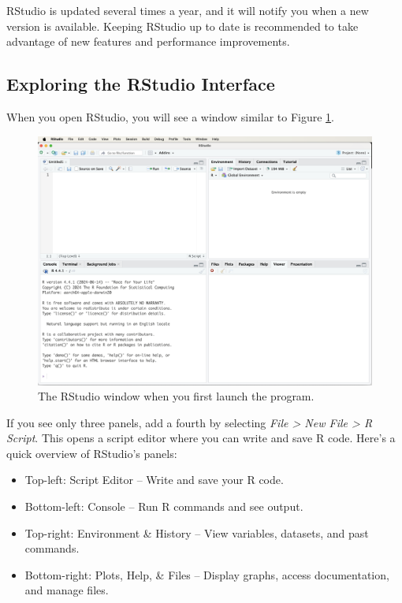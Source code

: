 \documentclass[
]{book}
\providecommand{\tightlist}{%
  \setlength{\itemsep}{0pt}\setlength{\parskip}{0pt}}
\theoremstyle{definition}
\theoremstyle{definition}
\theoremstyle{definition}
\theoremstyle{definition}
\theoremstyle{remark}
\begin{document}
RStudio is updated several times a year, and it will notify you when a new version is available. Keeping RStudio up to date is recommended to take advantage of new features and performance improvements.

\subsection*{Exploring the RStudio Interface}\label{exploring-the-rstudio-interface}

When you open RStudio, you will see a window similar to Figure \ref{fig:RStudio-window-1}.

\begin{figure}

{\centering \includegraphics[width=0.7\linewidth]{images/ch1_RStudio-window-1} 

}

\caption{The RStudio window when you first launch the program.}\label{fig:RStudio-window-1}
\end{figure}

If you see only three panels, add a fourth by selecting \emph{File \textgreater{} New File \textgreater{} R Script}. This opens a script editor where you can write and save R code. Here's a quick overview of RStudio's panels:

\begin{itemize}
\tightlist
\item
  Top-left: Script Editor -- Write and save your R code.\\
\item
  Bottom-left: Console -- Run R commands and see output.\\
\item
  Top-right: Environment \& History -- View variables, datasets, and past commands.\\
\item
  Bottom-right: Plots, Help, \& Files -- Display graphs, access documentation, and manage files.
\end{itemize}
\end{document}
